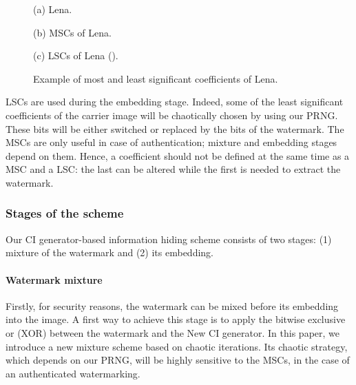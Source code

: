 \documentclass[journal]{IEEEtran}
\begin{document}
\begin{figure}[htb]

\begin{minipage}[b]{1.0\linewidth}
  \centering
 \centerline{}
  \centerline{(a) Lena.}
\end{minipage}

\begin{minipage}[b]{.48\linewidth}
  \centering
 \centerline{}
  \centerline{(b) MSCs of Lena.}
\end{minipage}
\hfill
\begin{minipage}[b]{0.48\linewidth}
  \centering
 \centerline{}
  \centerline{(c) LSCs of Lena ().}
\end{minipage}
\caption{Example of most and least significant coefficients of Lena.}
\label{fig:MSCLC}
\end{figure}


LSCs are used during the embedding stage. Indeed, some of the least significant coefficients of the carrier image will be chaotically chosen by using our PRNG. These bits will be either switched or replaced by the bits of the watermark. The MSCs are only useful in case of authentication; mixture and embedding stages depend on them. Hence, a coefficient should not be defined at the same time as a MSC and a LSC: the last can be altered while the first is needed to extract the watermark.

\subsubsection{Stages of the scheme}

Our CI generator-based information hiding scheme consists of two stages: (1) mixture of the watermark and (2) its embedding.

\paragraph{Watermark mixture}

Firstly, for security reasons, the watermark can be mixed before its embedding into the image. A first way to achieve this stage is to apply the bitwise exclusive or (XOR) between the watermark and the New CI generator. In this paper, we introduce a new mixture scheme based on chaotic iterations. Its chaotic strategy, which depends on our PRNG, will be highly sensitive to the MSCs, in the case of an authenticated watermarking.
\end{document}
